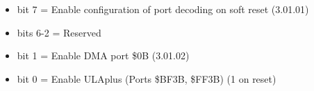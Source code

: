 \begin{itemize}
\item bit 7 = Enable configuration of port decoding on soft reset (3.01.01)
\item bits 6-2 = Reserved
\item bit 1 = Enable DMA port \$0B (3.01.02)
\item bit 0 = Enable ULAplus (Ports \$BF3B, \$FF3B) (1 on reset)
\end{itemize}

